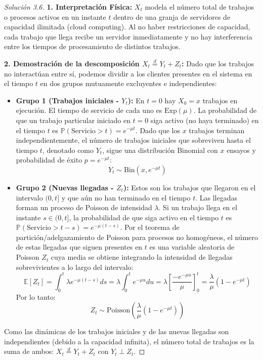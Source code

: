 \documentclass[10pt,a4paper]{article}
\begin{document}
\begin{proof}[Solución 3.6]
    \textbf{1. Interpretación Física:}
    $X_t$ modela el número total de trabajos o procesos activos en un instante $t$ dentro de una granja de servidores de capacidad ilimitada (cloud computing). Al no haber restricciones de capacidad, cada trabajo que llega recibe un servidor inmediatamente y no hay interferencia entre los tiempos de procesamiento de distintos trabajos.

    \textbf{2. Demostración de la descomposición $X_t \stackrel{d}{=} Y_t + Z_t$:}
    Dado que los trabajos no interactúan entre sí, podemos dividir a los clientes presentes en el sistema en el tiempo $t$ en dos grupos mutuamente excluyentes e independientes:
    \begin{itemize}
        \item \textbf{Grupo 1 (Trabajos iniciales - $Y_t$):} En $t=0$ hay $X_0 = x$ trabajos en ejecución. El tiempo de servicio de cada uno es $\text{Exp}(\mu)$. La probabilidad de que un trabajo particular iniciado en $t=0$ siga activo (no haya terminado) en el tiempo $t$ es $\mathbb{P}(\text{Servicio} > t) = e^{-\mu t}$. Dado que los $x$ trabajos terminan independientemente, el número de trabajos iniciales que sobreviven hasta el tiempo $t$, denotado como $Y_t$, sigue una distribución Binomial con $x$ ensayos y probabilidad de éxito $p = e^{-\mu t}$:
        $$ Y_t \sim \text{Bin}(x, e^{-\mu t}) $$
        
        \item \textbf{Grupo 2 (Nuevas llegadas - $Z_t$):} Estos son los trabajos que llegaron en el intervalo $(0, t]$ y que aún no han terminado en el tiempo $t$. Las llegadas forman un proceso de Poisson de intensidad $\lambda$. Si un trabajo llega en el instante $s \in (0, t]$, la probabilidad de que siga activo en el tiempo $t$ es $\mathbb{P}(\text{Servicio} > t-s) = e^{-\mu(t-s)}$. 
        Por el teorema de partición/adelgazamiento de Poisson para procesos no homogéneos, el número de estas llegadas que siguen presentes en $t$ es una variable aleatoria de Poisson $Z_t$ cuya media se obtiene integrando la intensidad de llegadas sobrevivientes a lo largo del intervalo:
        $$ \mathbb{E}[Z_t] = \int_0^t \lambda e^{-\mu(t-s)} ds = \lambda \int_0^t e^{-\mu u} du = \lambda \left[ \frac{-e^{-\mu u}}{\mu} \right]_0^t = \frac{\lambda}{\mu}(1 - e^{-\mu t}) $$
        Por lo tanto:
        $$ Z_t \sim \text{Poisson}\left(\frac{\lambda}{\mu}(1 - e^{-\mu t})\right) $$
    \end{itemize}
    Como las dinámicas de los trabajos iniciales y de las nuevas llegadas son independientes (debido a la capacidad infinita), el número total de trabajos es la suma de ambos: $X_t \stackrel{d}{=} Y_t + Z_t$ con $Y_t \perp Z_t$.


\end{proof}
\end{document}
